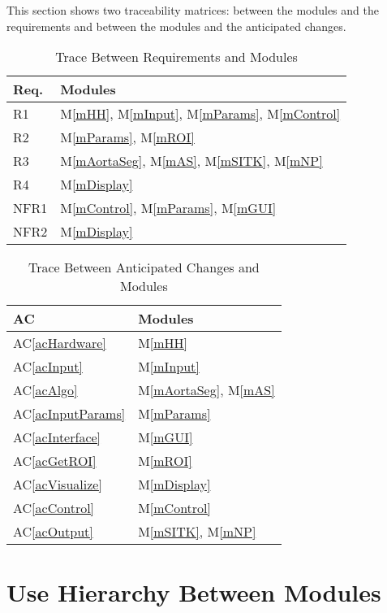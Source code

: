 \documentclass[12pt, titlepage]{article}
\newcommand{\acref}[1]{AC\ref{#1}}
\newcommand{\mref}[1]{M\ref{#1}}
\begin{document}
This section shows two traceability matrices: between the modules and the
requirements and between the modules and the anticipated changes.

\begin{table}[H]
\centering
\begin{tabular}{p{} p{}}
\toprule
\textbf{Req.} & \textbf{Modules}\\
\midrule
R1 & \mref{mHH}, \mref{mInput}, \mref{mParams}, \mref{mControl}\\
R2 & \mref{mParams}, \mref{mROI}\\
R3 &  \mref{mAortaSeg}, \mref{mAS}, \mref{mSITK}, \mref{mNP}\\
R4 & \mref{mDisplay}\\
NFR1 & \mref{mControl}, \mref{mParams}, \mref{mGUI}\\
NFR2 & \mref{mDisplay}\\
\bottomrule
\end{tabular}
\caption{Trace Between Requirements and Modules}
\label{TblRT}
\end{table}

\begin{table}[H]
\centering
\begin{tabular}{p{} p{}}
\toprule
\textbf{AC} & \textbf{Modules}\\
\midrule
\acref{acHardware} & \mref{mHH}\\
\acref{acInput} & \mref{mInput}\\
\acref{acAlgo} & \mref{mAortaSeg}, \mref{mAS}\\
\acref{acInputParams} & \mref{mParams}\\
\acref{acInterface} & \mref{mGUI}\\
\acref{acGetROI} & \mref{mROI} \\
\acref{acVisualize} & \mref{mDisplay}\\
\acref{acControl} & \mref{mControl}\\
\acref{acOutput} & \mref{mSITK}, \mref{mNP} \\
\bottomrule
\end{tabular}
\caption{Trace Between Anticipated Changes and Modules}
\label{TblACT}
\end{table}

\section{Use Hierarchy Between Modules} \label{SecUse}
\end{document}
